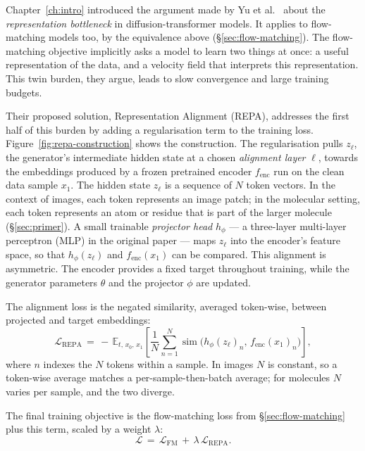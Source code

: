 \documentclass[12pt,a4paper,twoside]{report}
\begin{document}
Chapter~\ref{ch:intro} introduced the argument made by Yu et al.~\cite{REPA} about the \emph{representation bottleneck} in diffusion-transformer models. It applies to flow-matching models too, by the equivalence above (\S\ref{sec:flow-matching}). The flow-matching objective implicitly asks a model to learn two things at once: a useful representation of the data, and a velocity field that interprets this representation. This twin burden, they argue, leads to slow convergence and large training budgets.

Their proposed solution, Representation Alignment (REPA), addresses the first half of this burden by adding a regularisation term to the training loss. Figure~\ref{fig:repa-construction} shows the construction. The regularisation pulls $z_\ell$, the generator's intermediate hidden state at a chosen \emph{alignment layer} $\ell$, towards the embeddings produced by a frozen pretrained encoder $f_{\text{enc}}$ run on the clean data sample $x_1$. The hidden state $z_\ell$ is a sequence of $N$ token vectors. In the context of images, each token represents an image patch; in the molecular setting, each token represents an atom or residue that is part of the larger molecule (\S\ref{sec:primer}). A small trainable \emph{projector head} $h_\phi$ --- a three-layer multi-layer perceptron (MLP) in the original paper --- maps $z_\ell$ into the encoder's feature space, so that $h_\phi(z_\ell)$ and $f_{\text{enc}}(x_1)$ can be compared. This alignment is asymmetric. The encoder provides a fixed target throughout training, while the generator parameters $\theta$ and the projector $\phi$ are updated.

The alignment loss is the negated similarity, averaged token-wise, between projected and target embeddings:
\[
  \mathcal{L}_{\text{REPA}} \,=\, -\, \mathbb{E}_{t,\, x_0,\, x_1} \left[ \frac{1}{N} \sum_{n=1}^{N} \operatorname{sim}\bigl( h_\phi(z_\ell)_n,\, f_{\text{enc}}(x_1)_n \bigr) \right],
\]
where $n$ indexes the $N$ tokens within a sample. In images $N$ is constant, so a token-wise average matches a per-sample-then-batch average; for molecules $N$ varies per sample, and the two diverge.

The final training objective is the flow-matching loss from \S\ref{sec:flow-matching} plus this term, scaled by a weight $\lambda$:
\[
  \mathcal{L} \,=\, \mathcal{L}_{\text{FM}} \,+\, \lambda\, \mathcal{L}_{\text{REPA}}.
\]
\end{document}
